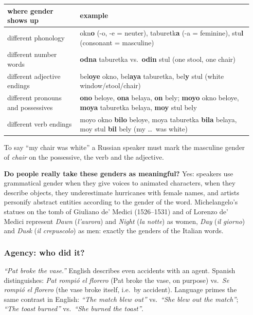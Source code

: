 \begin{center}
\small
\begin{tabularx}{\linewidth}{@{}>{\raggedright\arraybackslash}p{3.6cm} X@{}}
\toprule
\textbf{where gender shows up} & \textbf{example} \\
\midrule
different phonology & okn\textbf{o} (-o, -e = neuter), taburetk\textbf{a} (-a =
  feminine), stu\textbf{l} (consonant = masculine) \\
different number words & \textbf{odna} taburetka vs.\ \textbf{odin} stul (one stool,
  one chair) \\
different adjective endings & bel\textbf{oye} okno, bel\textbf{aya} taburetka,
  bel\textbf{y} stul (white window/stool/chair) \\
different pronouns and possessives & \textbf{ono} beloye, \textbf{ona} belaya, \textbf{on}
  bely; \textbf{moyo} okno beloye, \textbf{moya} taburetka belaya, \textbf{moy} stul
  bely \\
different verb endings & moyo okno \textbf{bilo} beloye, moya taburetka \textbf{bila}
  belaya, moy stul \textbf{bil} bely (my \ldots\ was white) \\
\bottomrule
\end{tabularx}
\end{center}
To say ``my chair was white'' a Russian speaker must mark the masculine gender of
\emph{chair} on the possessive, the verb and the adjective.

\textbf{Do people really take these genders as meaningful?} Yes: speakers use
grammatical gender when they give voices to animated characters, when they describe
objects, they underestimate hurricanes with female names, and artists personify abstract
entities according to the gender of the word. Michelangelo's statues on the tomb of
Giuliano de' Medici (1526--1531) and of Lorenzo de' Medici represent \emph{Dawn}
(\emph{l'aurora}) and \emph{Night} (\emph{la notte}) as women, \emph{Day} (\emph{il
giorno}) and \emph{Dusk} (\emph{il crepuscolo}) as men: exactly the genders of the
Italian words.

\subsubsection{Agency: who did it?}

\emph{``Pat broke the vase.''} English describes even accidents with an agent. Spanish
distinguishes: \emph{Pat rompió el florero} (Pat broke the vase, on purpose) vs.\
\emph{Se rompió el florero} (the vase broke itself, i.e.\ by accident). Language primes
the same contrast in English: \emph{``The match blew out''} vs.\ \emph{``She blew out the
match''}; \emph{``The toast burned''} vs.\ \emph{``She burned the toast''}.

